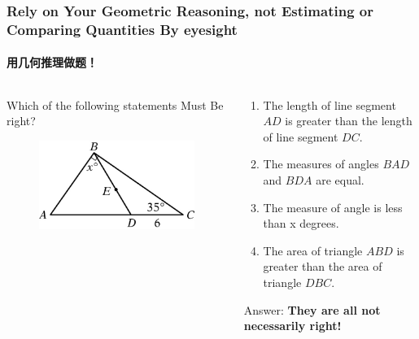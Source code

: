 \documentclass[
	11pt, %
	handout,
]{beamer}
\begin{document}

\begin{frame}
	\frametitle{Rely on Your Geometric Reasoning, not Estimating or Comparing Quantities By eyesight} %
	\framesubtitle{用几何推理做题！}
	\begin{columns}[t] 
		\begin{column}{0.4\textwidth} %
		Which of the following statements \alert{Must Be} right?
			\begin{figure}
				\includegraphics[width=\linewidth]{Not_Scale.jpg}
			\end{figure}
		\end{column}

	\begin{column}{0.6\textwidth} %
	\begin{enumerate}
		\item The length of line segment $AD$ is greater than the length of line segment $DC$.
		\item The measures of angles $BAD$ and $BDA$ are equal.
		\item The measure of angle is less than x degrees.
		\item The area of triangle $ABD$ is greater than the area of triangle $DBC$.
	\end{enumerate}
	\pause
	Answer: \textbf{\alert{They are all not necessarily right!}}
	\end{column}
	\end{columns}
\end{frame}


\end{document}
